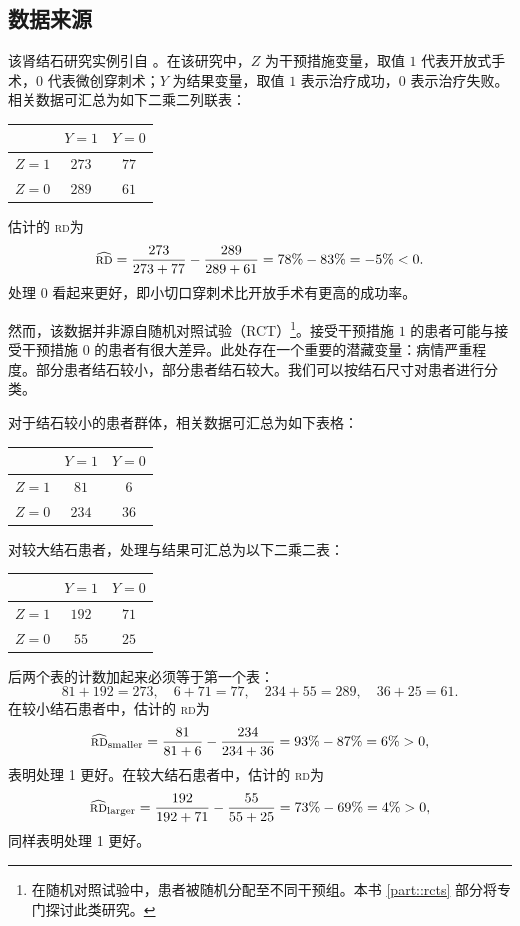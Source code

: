 \subsection{数据来源}
该肾结石研究实例引自 \citet{charig1986comparison}。在该研究中，$Z$ 为干预措施变量，取值 $1$ 代表开放式手术，$0$ 代表微创穿刺术；$Y$ 为结果变量，取值 $1$ 表示治疗成功，$0$ 表示治疗失败。相关数据可汇总为如下二乘二列联表： 

 \begin{center}
\begin{tabular}{lcc}
\hline 
        & $Y =1$ & $Y =0$\\\hline
$Z =1$ & $273$ & $77$\\ 
$Z =0$ & $289$ & $61$\\ 
\hline 
\end{tabular}
\end{center}



估计的 \textsc{rd}为
$$
\widehat{\textsc{rd}} = \frac{273}{273 + 77} - \frac{289}{289 + 61} = 78\% - 83\% = -5\% <0. 
$$
处理 0 看起来更好，即小切口穿刺术比开放手术有更高的成功率。 


然而，该数据并非源自随机对照试验（RCT）\footnote{在随机对照试验中，患者被随机分配至不同干预组。本书 \ref{part::rcts} 部分将专门探讨此类研究。}。接受干预措施 $1$ 的患者可能与接受干预措施 $0$ 的患者有很大差异。此处存在一个重要的潜藏变量：病情严重程度。部分患者结石较小，部分患者结石较大。我们可以按结石尺寸对患者进行分类。


对于结石较小的患者群体，相关数据可汇总为如下表格： 
 \begin{center}
\begin{tabular}{lcc}
\hline 
        & $Y =1$ & $Y =0$\\\hline
$Z =1$ & $81$ & $6$\\ 
$Z =0$ & $234$ & $36$\\
\hline 
\end{tabular}
\end{center}
对较大结石患者，处理与结果可汇总为以下二乘二表：  
 \begin{center}
\begin{tabular}{lcc}
\hline 
        & $Y =1$ & $Y =0$\\\hline
$Z =1$ & $192$ & $71$\\ 
$Z =0$ & $55$ & $25$\\
\hline 
\end{tabular}
\end{center}


后两个表的计数加起来必须等于第一个表：
$$
81 + 192 = 273,\quad 6 + 71 =77,\quad   234 + 55 = 289, \quad 36 + 25 = 61 .  
$$
在较小结石患者中，估计的 \textsc{rd}为
$$
\widehat{\textsc{rd}}_\text{smaller} = \frac{81}{81 + 6} - \frac{234}{234 + 36} = 93\% - 87\% = 6\% > 0,
$$
表明处理 1 更好。在较大结石患者中，估计的 \textsc{rd}为
$$
\widehat{\textsc{rd}}_\text{larger} = \frac{192}{192 + 71} - \frac{55}{55+25} = 73\% - 69\% = 4\% > 0 ,
$$
同样表明处理 1 更好。 


